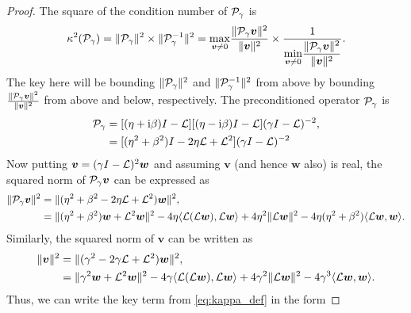 \documentclass[a4paper,10pt]{article}
\begin{document}
\begin{proof}

The square of the condition number of ${\cal P}_{\gamma}$ is
\begin{align}
\label{eq:kappa_def}
\kappa^2({\cal P}_{\gamma}) 
= 
\Vert {\cal P}_{\gamma} \Vert^2 
\times
\Vert {\cal P}_{\gamma}^{-1} \Vert^2
=
\underset{{\bm{v} \neq 0}}{\max} \frac{\Vert {\cal P}_{\gamma} \bm{v} \Vert^2 }{\Vert \bm{v} \Vert^2} 
\times 
\frac{1}{\displaystyle{\underset{{\bm{v} \neq 0}}{\min} \frac{\Vert {\cal P}_{\gamma} \bm{v} \Vert^2 }{\Vert \bm{v} \Vert^2}}}.
\end{align}
The key here will be bounding $\Vert {\cal P}_{\gamma} \Vert^2$ and $\Vert {\cal P}_{\gamma}^{-1} \Vert^2$ from above by bounding $\frac{\Vert {\cal P}_{\gamma} \bm{v} \Vert^2 }{\Vert \bm{v} \Vert^2}$ from above and below, respectively.
%
The preconditioned operator ${\cal P}_{\gamma}$ is 
\begin{align*}
{\cal P}_{\gamma} 
&= 
[(\eta + \mathrm{i}\beta)I -
\mathcal{L}][(\eta - \mathrm{i}\beta)I - \mathcal{L}] (\gamma I - {\cal L})^{-2}, \\
&=
[(\eta^2 + \beta^2) I - 2 \eta {\cal L} + {\cal L}^2] (\gamma I - {\cal L})^{-2}
\end{align*}
Now putting $\bm{v} = (\gamma I - {\cal L})^{2} \bm{w}$ and assuming $\bm{v}$ (and hence $\bm{w}$ also) is real, the squared norm of ${\cal P}_{\gamma} \bm{v}$ can be expressed as
\begin{align}
\label{eq:norm_Pv}
\Vert {\cal P}_{\gamma} \bm{v} \Vert^2
&=
\Vert ( \eta^2 + \beta^2 - 2\eta{\cal L} + {\cal L}^2 ) \bm{w} \Vert^2, \\
&=
\nonumber
\Vert (\eta^2 + \beta^2) \bm{w} + {\cal L}^2 \bm{w} \Vert^2  - 4 \eta \langle {\cal L}({\cal L} \bm{w}), {\cal L}\bm{w} \rangle + 4 \eta^2 \Vert {\cal L} \bm{w} \Vert^2 - 4 \eta (\eta^2 +\beta^2) \langle {\cal L} \bm{w}, \bm{w} \rangle.
\end{align}
Similarly, the squared norm of $\bm{v}$ can be written as
\begin{align}
\label{eq:norm_v}
\Vert \bm{v} \Vert^2
&=
\Vert ( \gamma^2 - 2\gamma{ \cal L} + {\cal L}^2 ) \bm{w} \Vert^2, \\
&=
\nonumber
\Vert \gamma^2 \bm{w} + {\cal L}^2 \bm{w} \Vert^2  - 4 \gamma \langle {\cal L}({\cal L} \bm{w}), {\cal L}\bm{w} \rangle + 4 \gamma^2 \Vert {\cal L} \bm{w} \Vert^2 - 4 \gamma^3 \langle {\cal L} \bm{w}, \bm{w} \rangle.
\end{align}
Thus, we can write the key term from \eqref{eq:kappa_def} in the form

\end{proof}
\end{document}
